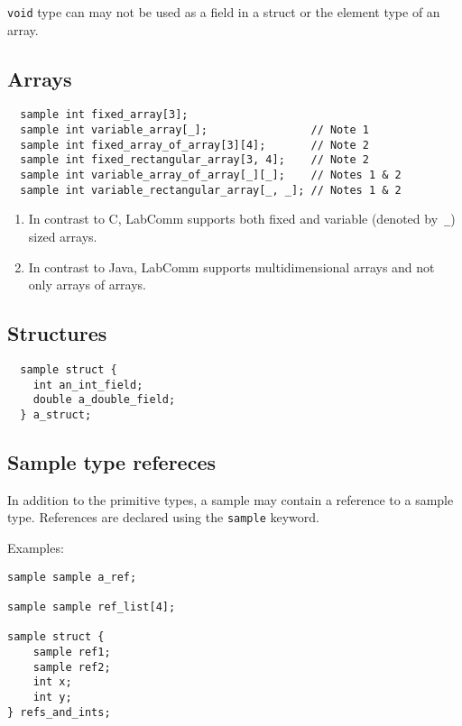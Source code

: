 \documentclass[a4paper]{article}
\begin{document}
\verb+void+ type can may not be used as a field in a struct or
the element type of an array.


\subsection{Arrays}

\begin{verbatim}
  sample int fixed_array[3];
  sample int variable_array[_];                // Note 1
  sample int fixed_array_of_array[3][4];       // Note 2
  sample int fixed_rectangular_array[3, 4];    // Note 2
  sample int variable_array_of_array[_][_];    // Notes 1 & 2
  sample int variable_rectangular_array[_, _]; // Notes 1 & 2
\end{verbatim}

\begin{enumerate}
\item In contrast to C, LabComm supports both fixed and variable (denoted
by~\verb+_+) sized arrays.

\item In contrast to Java, LabComm supports multidimensional arrays and not
only arrays of arrays.

\end{enumerate}

\subsection{Structures}

\begin{verbatim}
  sample struct {
    int an_int_field;
    double a_double_field;
  } a_struct;
\end{verbatim}

\subsection{Sample type refereces}

In addition to the primitive types, a sample may contain
a reference to a sample type. References are declared using
the \verb+sample+ keyword.

Examples:

\begin{verbatim}
sample sample a_ref;

sample sample ref_list[4];

sample struct { 
    sample ref1;
    sample ref2;
    int x;
    int y;
} refs_and_ints;
\end{verbatim}
\end{document}
